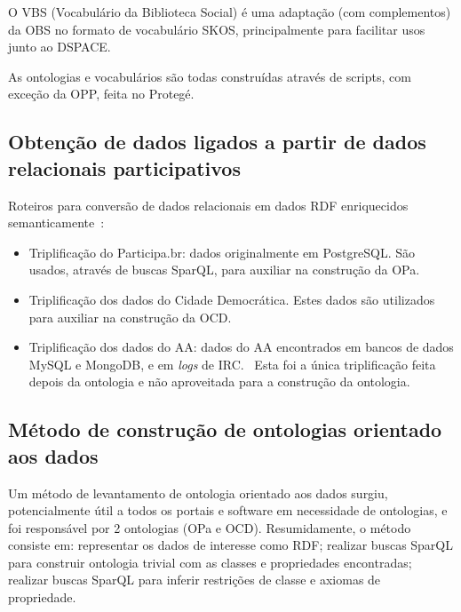 \documentclass[a4paper,openright,12pt]{report} %
\begin{document}
O
VBS (Vocabulário da Biblioteca Social) é uma adaptação (com complementos)
            da OBS no formato
            de vocabulário SKOS, principalmente para facilitar
            usos junto ao DSPACE.

As ontologias e vocabulários são todas construídas através de scripts, com exceção da
OPP, feita no Protegé.~\cite{pnud5}

\subsection{Obtenção de dados ligados a partir de dados relacionais participativos}
Roteiros para conversão de dados relacionais em dados RDF enriquecidos semanticamente~\cite{pnud5}:
\begin{itemize}
    \item Triplificação do Participa.br: 
        dados originalmente em PostgreSQL. São usados, através de buscas SparQL, para auxiliar na construção da OPa.
    \item Triplificação dos dados do Cidade Democrática.
        Estes
        dados são utilizados para auxiliar na construção
        da OCD.
    \item Triplificação dos dados do AA:
        dados do AA encontrados em bancos de dados MySQL
        e MongoDB, e em \emph{logs} de IRC.~\cite{ensaaio,pnud5}
                Esta foi a única triplificação feita depois da ontologia e não aproveitada para a construção da ontologia.
\end{itemize}


\subsection{Método de construção de ontologias orientado aos dados}\label{sec:oda}
Um método de levantamento de ontologia orientado aos dados surgiu, potencialmente útil a todos os portais e software em necessidade de ontologias, e foi responsável por 2 ontologias (OPa e OCD).
Resumidamente, o método consiste em: representar os dados de interesse como RDF; realizar buscas SparQL para construir ontologia trivial com as classes e propriedades encontradas; realizar buscas SparQL para inferir restrições de classe e axiomas de propriedade.~\cite{pnud5}
\end{document}
